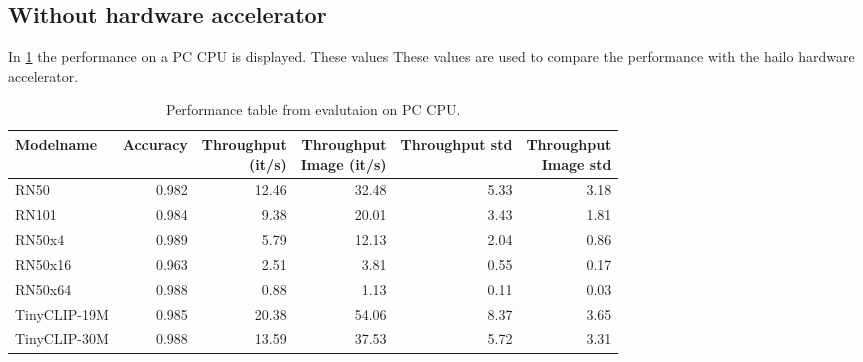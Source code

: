 \subsection{Without hardware accelerator}
In \cref{result:tab:perfPC} the performance on a PC CPU is displayed.
These values 
These values are used to compare the performance with the hailo hardware accelerator.

\begin{table}[]
    \centering
    \begin{tabular}{l|rrrrr}
    \hline
        Modelname & Accuracy & \makecell{Throughput\\(it/s)} & \makecell{Throughput \\ Image (it/s)} & Throughput std & \makecell{Throughput\\Image std} \\ \hline
        RN50 & 0.982 & 12.46 & 32.48 & 5.33 & 3.18 \\ 
        RN101 & 0.984 & 9.38 & 20.01 & 3.43 & 1.81 \\ 
        RN50x4 & 0.989 & 5.79 & 12.13 & 2.04 & 0.86 \\ 
        RN50x16 & 0.963 & 2.51 & 3.81 & 0.55 & 0.17 \\ 
        RN50x64 & 0.988 & 0.88 & 1.13 & 0.11 & 0.03 \\ 
        TinyCLIP-19M & 0.985 & 20.38 & 54.06 & 8.37 & 3.65 \\ 
        TinyCLIP-30M & 0.988 & 13.59 & 37.53 & 5.72 & 3.31 \\ 
    \end{tabular}
    \caption{Performance table from evalutaion on PC CPU.}
    \label{result:tab:perfPC}
\end{table}

